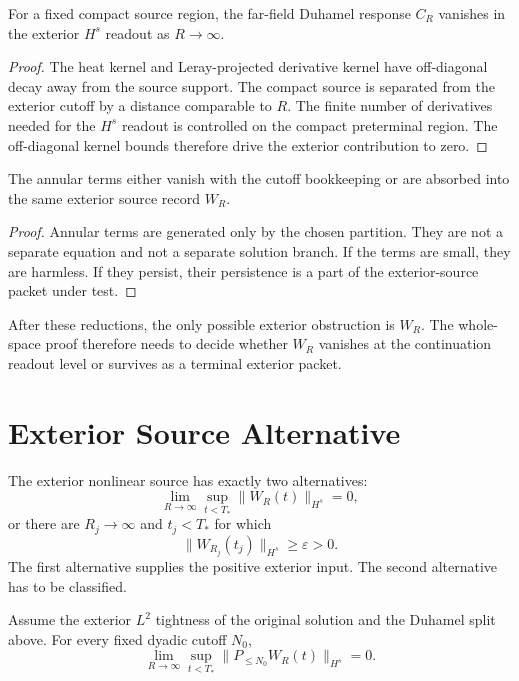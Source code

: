 \begin{lemma}
For a fixed compact source region, the far-field Duhamel response \(C_R\) vanishes in the exterior \(H^s\) readout as \(R\to\infty\).
\end{lemma}

\begin{proof}
The heat kernel and Leray-projected derivative kernel have off-diagonal decay away from the source support.
The compact source is separated from the exterior cutoff by a distance comparable to \(R\).
The finite number of derivatives needed for the \(H^s\) readout is controlled on the compact preterminal region.
The off-diagonal kernel bounds therefore drive the exterior contribution to zero.
\end{proof}

\begin{lemma}
The annular terms either vanish with the cutoff bookkeeping or are absorbed into the same exterior source record \(W_R\).
\end{lemma}

\begin{proof}
Annular terms are generated only by the chosen partition.
They are not a separate equation and not a separate solution branch.
If the terms are small, they are harmless.
If they persist, their persistence is a part of the exterior-source packet under test.
\end{proof}

After these reductions, the only possible exterior obstruction is \(W_R\).
The whole-space proof therefore needs to decide whether \(W_R\) vanishes at the continuation readout level or survives as a terminal exterior packet.

\section{Exterior Source Alternative}

The exterior nonlinear source has exactly two alternatives:
\[
  \lim_{R\to\infty}\sup_{t<T_*}\|W_R(t)\|_{H^s}=0,
\]
or there are \(R_j\to\infty\) and \(t_j<T_*\) for which
\[
  \|W_{R_j}(t_j)\|_{H^s}\ge\varepsilon>0.
\]
The first alternative supplies the positive exterior input.
The second alternative has to be classified.

\begin{proposition}
Assume the exterior \(L^2\) tightness of the original solution and the Duhamel split above.
For every fixed dyadic cutoff \(N_0\),
\[
  \lim_{R\to\infty}\sup_{t<T_*}
  \|P_{\le N_0}W_R(t)\|_{H^s}=0.
\]
\end{proposition}

